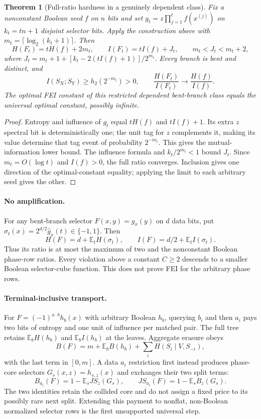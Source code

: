 \documentclass[11pt]{article}
\newtheorem{theorem}{Theorem}
\newcommand{\E}{\mathbb E}
\newcommand{\wh}{\widehat}
\begin{document}
\begin{theorem}[Full-ratio hardness in a genuinely dependent class]
Fix a nonconstant Boolean seed $f$ on $n$ bits and set $g_t=z\prod_{j=1}^t f(x^{(j)})$ on $k_t=tn+1$ disjoint selector bits. Apply the construction above with $m_t=\lceil\log_2(k_t+1)\rceil$. Then
\[
 H(F_t)=tH(f)+2m_t,\qquad I(F_t)=tI(f)+J_t,\qquad m_t<J_t<m_t+2,
\]
where $J_t=m_t+1+[k_t-2(tI(f)+1)]/2^{m_t}$. Every branch is bent and distinct, and
\[
 I(S_X;S_Y)\ge h_2(2^{-m_t})>0,\qquad
 \frac{H(F_t)}{I(F_t)}\longrightarrow\frac{H(f)}{I(f)}.
\]
The optimal FEI constant of this restricted dependent bent-branch class equals the universal optimal constant, possibly infinite.
\end{theorem}
\begin{proof}
Entropy and influence of $g_t$ equal $tH(f)$ and $tI(f)+1$. Its extra $z$ spectral bit is deterministically one; the unit tag for $z$ complements it, making its value determine that tag event of probability $2^{-m_t}$. This gives the mutual-information lower bound. The influence formula and $k_t/2^{m_t}<1$ bound $J_t$. Since $m_t=O(\log t)$ and $I(f)>0$, the full ratio converges. Inclusion gives one direction of the optimal-constant equality; applying the limit to each arbitrary seed gives the other.
\end{proof}

\paragraph{No amplification.}
For any bent-branch selector $F(x,y)=g_x(y)$ on $d$ data bits, put $\sigma_t(x)=2^{d/2}\wh g_x(t)\in\{-1,1\}$. Then
\[
 H(F)=d+\E_t H(\sigma_t),\qquad I(F)=d/2+\E_t I(\sigma_t).
\]
Thus its ratio is at most the maximum of two and the nonconstant Boolean phase-row ratios. Every violation above a constant $C\ge2$ descends to a smaller Boolean selector-cube function. This does not prove FEI for the arbitrary phase rows.

\paragraph{Terminal-inclusive transport.}
For $F=(-1)^{a\cdot b}h_b(x)$ with arbitrary Boolean $h_b$, querying $b_i$ and then $a_i$ pays two bits of entropy and one unit of influence per matched pair. The full tree retains $\E_b H(h_b)$ and $\E_b I(h_b)$ at the leaves. Aggregate erasure obeys
\[
 B(F)=m+\E_b B(h_b)+\sum_i H(S_i\mid V,S_{-i}),
\]
with the last term in $[0,m]$. A data $a_i$ restriction first instead produces phase-core selectors $G_s(x,z)=h_{s,z}(x)$ and exchanges their two split terms:
\[
 B_{a_i}(F)=1-\E_s JS_z(G_s),\qquad
 JS_{a_i}(F)=1-\E_s B_z(G_s).
\]
The two identities retain the collided core and do not assign a fixed price to its possibly rare next split. Extending this payment to nonflat, non-Boolean normalized selector rows is the first unsupported universal step.
\end{document}
